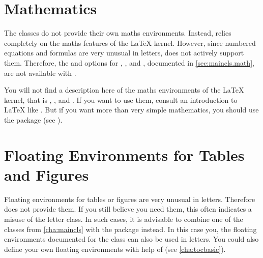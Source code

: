 \section{Mathematics}
%
\BeginIndexGroup
{}%
%
%

The \KOMAScript{} classes do not provide their own maths environments.
Instead, \KOMAScript{} relies completely on the maths features of the \LaTeX{}
kernel. However, since numbered equations and formulas
are very unusual in letters, \KOMAScript{} does not actively support them.
Therefore, the  and
 options for , ,
and , documented in \autoref{sec:maincls.math}, are not
available with .

You will not find a description here of the maths environments of the \LaTeX{}
kernel, that is ,
, and
. If you want to use them, consult an
introduction to \LaTeX{} like \cite{lshort}. But if you want
more than very simple mathematics, you should use the 
package (see \cite{package:amsmath}).%
%
\EndIndexGroup


\section{Floating Environments for Tables and Figures}

Floating environments for tables or figures are very unusual in letters.
Therefore  does not provide them. If you
still believe you need them, this often indicates a misuse of the letter
class. In such cases, it is advisable to combine one of the \KOMAScript{}
classes from \autoref{cha:maincls} with the
 package instead. In this
case you, the floating environments documented for the class can also be used
in letters. You could also define your own floating environments with help of
 (see \autoref{cha:tocbasic}).



